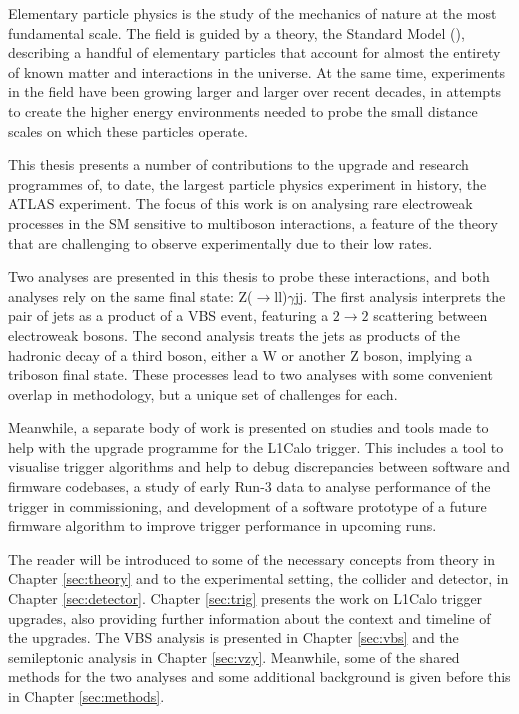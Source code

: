 Elementary particle physics is the study of the mechanics of nature at the most
fundamental scale. The field is guided by a theory, the Standard Model
(), describing a handful of elementary particles that account for almost
the entirety of known matter and interactions in the universe. At the same time,
experiments in the field have been growing larger and larger over recent
decades, in attempts to create the higher energy environments needed to probe
the small distance scales on which these particles operate.

This thesis presents a number of contributions to the upgrade and research
programmes of, to date, the largest particle physics experiment in history, the
\ac{ATLAS} experiment. The focus of this work is on analysing rare electroweak
processes in the \ac{SM} sensitive to multiboson interactions, a 
feature of the theory that are challenging to observe experimentally due to
their low rates.

Two analyses are presented in this thesis to probe these interactions, and both
analyses rely on the same final state: Z($\to$ll)$\gamma$jj. The first analysis
interprets the pair of jets as a product of a \ac{VBS} event, featuring a
$2\to2$ scattering between electroweak bosons. The second analysis treats the
jets as products of the hadronic decay of a third boson, either a W or another Z
boson, implying a triboson final state. These processes lead to two analyses
with some convenient overlap in methodology, but a unique set of challenges for
each.

Meanwhile, a separate body of work is presented on studies and tools made to
help with the upgrade programme for the \ac{L1Calo} trigger. This includes a
tool to visualise trigger algorithms and help to debug discrepancies between
software and firmware codebases, a study of early Run-3 data to analyse
performance of the trigger in commissioning, and development of a software
prototype of a future firmware algorithm to improve trigger performance in
upcoming runs.

The reader will be introduced to some of the necessary concepts from theory in
Chapter \ref{sec:theory} and to the experimental setting, the collider and
detector, in Chapter \ref{sec:detector}. Chapter \ref{sec:trig} presents the
work on \ac{L1Calo} trigger upgrades, also providing further information about the
context and timeline of the upgrades. The \ac{VBS} \Zy analysis is presented in
Chapter \ref{sec:vbs} and the semileptonic \VZy analysis in Chapter
\ref{sec:vzy}.  Meanwhile, some of the shared methods for the two analyses and
some additional background is given before this in Chapter \ref{sec:methods}.
